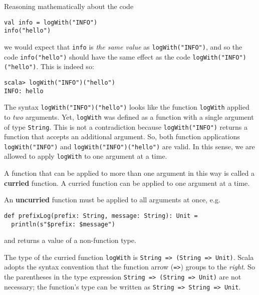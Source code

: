 Reasoning mathematically about the code
\begin{lstlisting}
val info = logWith("INFO")
info("hello")
\end{lstlisting}
we would expect that \lstinline!info!
is \emph{the same value} as \lstinline!logWith("INFO")!,
and so the code \lstinline!info("hello")!
should have the same effect as the code \lstinline!logWith("INFO")("hello")!.
This is indeed so:
\begin{lstlisting}
scala> logWith("INFO")("hello")
INFO: hello
\end{lstlisting}
The syntax \lstinline!logWith("INFO")("hello")!
looks like the function \lstinline!logWith!
applied to \emph{two} arguments. Yet, \lstinline!logWith!
was defined as a function with a single argument of type \lstinline!String!.
This is not a contradiction because \lstinline!logWith("INFO")!
returns a function that accepts an additional argument. So, both function
applications \lstinline!logWith("INFO")!
and \lstinline!logWith("INFO")("hello")!
are valid. In this sense, we are allowed to apply \lstinline!logWith!
to one argument at a time.

A function that can be applied to more than one argument in this way
is called a \textbf{curried} function. A
curried function can be applied to one argument at a time.

An \textbf{uncurried} function must be
applied to all arguments at once, e.g.
\begin{lstlisting}
def prefixLog(prefix: String, message: String): Unit =
  println(s"$prefix: $message")
\end{lstlisting}
and returns a value of a non-function type.

The type of the curried function \lstinline!logWith!
is \lstinline!String => (String => Unit)!.
Scala adopts the syntax convention that the function arrow (\lstinline!=>!)
groups to the \emph{right}. So the parentheses in the type expression
\lstinline!String => (String => Unit)!
are not necessary; the function's type can be written as \lstinline!String => String => Unit!.

